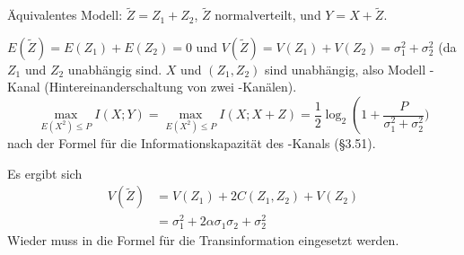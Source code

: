 \documentclass{article}
\begin{document}
\begin{solution}
    Äquivalentes Modell: $\tilde Z = Z_1+Z_2$, $\tilde Z$ normalverteilt, und $Y=X+\tilde Z$.
    \begin{tasks}
            \item $E(\tilde Z)=E(Z_1)+E(Z_2)=0$ und $V(\tilde Z)=V(Z_1)+V(Z_2)=\sigma_1^2+\sigma_2^2$ (da $Z_1$ und $Z_2$ unabhängig sind.
        $X$ und $(Z_1,Z_2)$ sind unabhängig, also Modell -Kanal (Hintereinanderschaltung von zwei -Kanälen).
        $$
        \max_{E(X^2)\leq P}{I(X;Y)} = \max_{E(X^2)\leq P}{I(X;X+Z)} = \frac 1 2\log_2\left(1+\frac{P}{\sigma_1^2+\sigma_2^2})
            $$ nach der Formel für die Informationskapazität des -Kanals (§3.51).
                \item Es ergibt sich
            \begin{align*}
                V(\tilde Z) &= V(Z_1)+2C(Z_1,Z_2)+V(Z_2)\\
                &=\sigma_1^2+2\alpha\sigma_1\sigma_2+\sigma_2^2
            \end{align*}
            Wieder muss in die Formel für die Transinformation eingesetzt werden.
        \end{tasks}
\end{solution}
\end{document}
